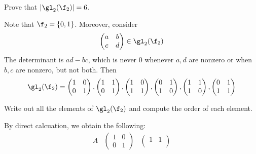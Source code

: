 \begin{problems}
    \item Prove that $|\gl_2(\f_2)| = 6$.
    \begin{sol}
        Note that $\f_2 = \{0, 1\}$. Moreover, consider
        $$\begin{pmatrix}
            a & b \\
            c & d
        \end{pmatrix} \in \gl_2(\f_2)$$
        The determinant is $ad - bc$, which is never 0 whenever $a, d$ are nonzero or when $b, c$ are nonzero, but not both. Then
        $$\gl_2(\f_2) = 
        \begin{pmatrix}
            1 & 0 \\
            0 & 1
        \end{pmatrix}, 
        \begin{pmatrix}
            1 & 1 \\
            0 & 1
        \end{pmatrix},
        \begin{pmatrix}
            1 & 0 \\
            1 & 1
        \end{pmatrix},
        \begin{pmatrix}
            0 & 1 \\
            1 & 0
        \end{pmatrix},
        \begin{pmatrix}
            1 & 1 \\
            1 & 0
        \end{pmatrix},
        \begin{pmatrix}
            0 & 1 \\
            1 & 1
        \end{pmatrix}$$
    \end{sol}
    \item Write out all the elements of $\gl_2(\f_2)$ and compute the order of each element.
    \begin{sol}
        By direct calcuation, we obtain the following:
        $$\begin{array}{c|c|c|c|c|c|c}
            A & 
            \begin{pmatrix}
                1 & 0 \\
                0 & 1
            \end{pmatrix} & 
            \begin{pmatrix}
                1 & 1 \\

\end{pmatrix}
\end{array}$$
\end{sol}
\end{problems}
